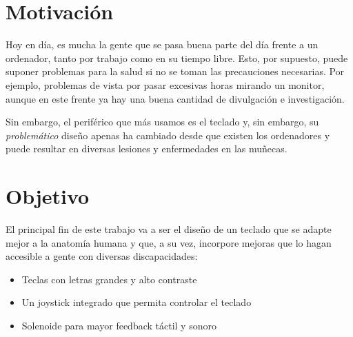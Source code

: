\section{Motivación}
Hoy en día, es mucha la gente que se pasa buena parte del día frente a un ordenador, tanto por trabajo como en su tiempo libre. Esto, por supuesto, puede suponer problemas para la salud si no se toman las precauciones necesarias. Por ejemplo, problemas de vista por pasar excesivas horas mirando un monitor, aunque en este frente ya hay una buena cantidad de divulgación e investigación.

Sin embargo, el periférico que más usamos es el teclado y, sin embargo, su \emph{problemático} diseño apenas ha cambiado desde que existen los ordenadores y puede resultar en diversas lesiones y enfermedades en las muñecas.

\section{Objetivo}
El principal fin de este trabajo va a ser el diseño de un teclado que se adapte mejor a la anatomía humana y que, a su vez, incorpore mejoras que lo hagan accesible a gente con diversas discapacidades:
\begin{itemize}
  \item Teclas con letras grandes y alto contraste
  \item Un joystick integrado que permita controlar el teclado
  \item Solenoide para mayor feedback táctil y sonoro
\end{itemize}
